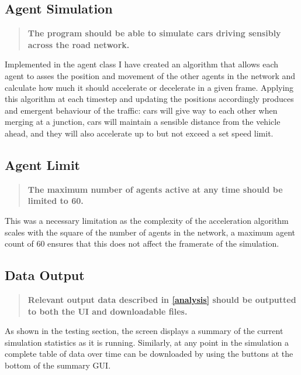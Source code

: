     \subsection{Agent Simulation}

        \begin{quote}
            \textbf{The program should be able to simulate cars driving sensibly across the road network.}
        \end{quote}

        Implemented in the agent class I have created an algorithm that allows each agent to asses the position and movement of the other agents in the network and calculate how much it should accelerate or decelerate in a given frame. Applying this algorithm at each timestep and updating the positions accordingly produces and emergent behaviour of the traffic: cars will give way to each other when merging at a junction, cars will maintain a sensible distance from the vehicle ahead, and they will also accelerate up to but not exceed a set speed limit.

    \subsection{Agent Limit}

        \begin{quote}
            \textbf{The maximum number of agents active at any time should be limited to 60.}
        \end{quote}

        This was a necessary limitation as the complexity of the acceleration algorithm scales with the square of the number of agents in the network, a maximum agent count of 60 ensures that this does not affect the framerate of the simulation.

    \subsection{Data Output}

        \begin{quote}
            \textbf{Relevant output data described in \autoref{analysis} should be outputted to both the UI and downloadable files.}
        \end{quote}

        As shown in the testing section, the screen displays a summary of the current simulation statistics as it is running. Similarly, at any point in the simulation a complete table of data over time can be downloaded by using the buttons at the bottom of the summary GUI.

